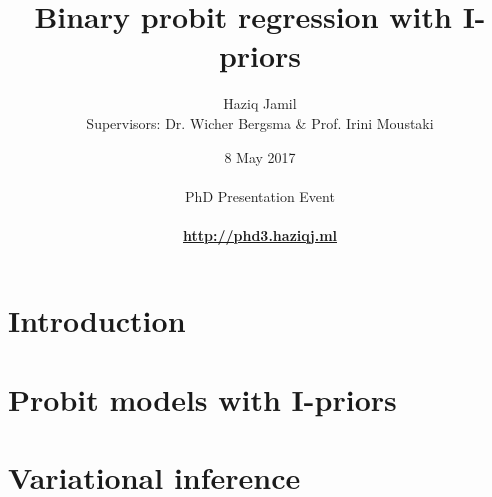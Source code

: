 \documentclass[]{beamer}
\begin{document}

\title[I-prior probit]{Binary probit regression with I-priors}
\author[Haziq Jamil]{
  \large{Haziq Jamil}\\ 
  \footnotesize{Supervisors: Dr. Wicher Bergsma \& Prof. Irini Moustaki}
}
\date[8 May 2017]{
  8 May 2017\\
  \hspace{1cm}\\
  PhD Presentation Event\\
  \hspace{1cm}\\
  \href{http://phd3.haziqj.ml}{\color{fu-red!60} \textbf{http://phd3.haziqj.ml}}
}

\mytitle


\mytoc


\section{Introduction}


\section[Probit with I-priors]{Probit models with I-priors}
\transition


\section[Variational]{Variational inference}
\transition

\end{document}
